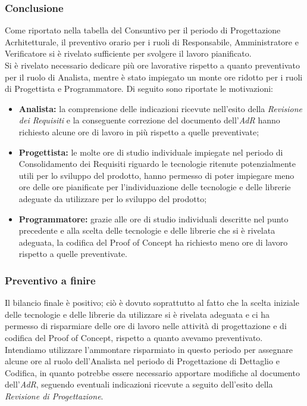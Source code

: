 	\subsubsection{Conclusione}
		Come riportato nella tabella del Consuntivo per il periodo di Progettazione Acrhitetturale, il preventivo orario per i ruoli di Responsabile, Amministratore e Verificatore si è rivelato sufficiente per svolgere il lavoro pianificato. \\
		Si è rivelato necessario dedicare più ore lavorative rispetto a quanto preventivato per il ruolo di Analista, mentre è stato impiegato un monte ore ridotto per i ruoli di Progettista e Programmatore. Di seguito sono riportate le motivazioni:
		\begin{itemize}
			\item \textbf{Analista:} la comprensione delle indicazioni ricevute nell'esito della \textit{Revisione dei Requisiti} e la conseguente correzione del documento dell'\textit{AdR{}} hanno richiesto alcune ore di lavoro in più rispetto a quelle preventivate;
			\item \textbf{Progettista:} le molte ore di studio individuale impiegate nel periodo di Consolidamento dei Requisiti riguardo le tecnologie ritenute potenzialmente utili per lo sviluppo del prodotto, hanno permesso di poter impiegare meno ore delle ore pianificate per l'individuazione delle tecnologie e delle librerie adeguate da utilizzare per lo sviluppo del prodotto;
			\item \textbf{Programmatore:} grazie alle ore di studio individuali descritte nel punto precedente e alla scelta delle tecnologie e delle librerie che si è rivelata adeguata, la codifica del Proof of Concept ha richiesto meno ore di lavoro rispetto a quelle preventivate.
		\end{itemize}
	\subsubsection{Preventivo a finire}
	Il bilancio finale è positivo; ciò è dovuto soprattutto al fatto che la scelta iniziale delle tecnologie e delle librerie da utilizzare si è rivelata adeguata e ci ha permesso di risparmiare delle ore di lavoro nelle attività di progettazione e di codifica del Proof of Concept, rispetto a quanto avevamo preventivato. \\
	Intendiamo utilizzare l'ammontare risparmiato in questo periodo per assegnare alcune ore al ruolo dell'Analista nel periodo di Progettazione di Dettaglio e Codifica, in quanto potrebbe essere necessario apportare modifiche al documento dell'\textit{AdR{}}, seguendo eventuali indicazioni ricevute a seguito dell'esito della \textit{Revisione di Progettazione}.
	
